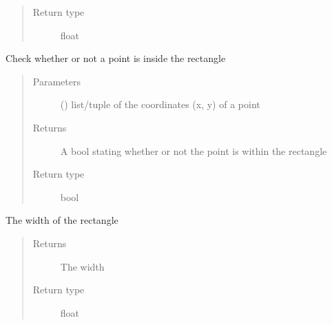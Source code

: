 \documentclass[letterpaper,10pt,english]{sphinxmanual}
\begin{document}
\begin{fulllineitems}
\begin{fulllineitems}
\begin{quote}
\begin{description}
\item[{Return type}] \leavevmode
float

\end{description}\end{quote}

\end{fulllineitems}


\begin{fulllineitems}
\label{\detokenize{source/pyzones:pyzones.Rectangle.is_point_inside}}
Check whether or not a point is inside the rectangle
\begin{quote}\begin{description}
\item[{Parameters}] \leavevmode
{} () \textendash{} list/tuple of the coordinates (x, y) of a point

\item[{Returns}] \leavevmode
A bool stating whether or not the point is within the rectangle

\item[{Return type}] \leavevmode
bool

\end{description}\end{quote}

\end{fulllineitems}


\begin{fulllineitems}
\label{\detokenize{source/pyzones:pyzones.Rectangle.width}}
The width of the rectangle
\begin{quote}\begin{description}
\item[{Returns}] \leavevmode
The width

\item[{Return type}] \leavevmode
float

\end{description}\end{quote}


\end{fulllineitems}
\end{fulllineitems}
\end{document}
